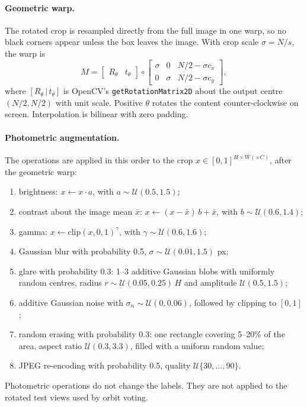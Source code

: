 \paragraph{Geometric warp.}
The rotated crop is resampled directly from the full image in one warp, so no black corners appear unless the box leaves the image. With crop scale $\sigma=N/s$, the warp is
\begin{equation}
  M=\begin{bmatrix}R_\theta & t_\theta\end{bmatrix}\circ\begin{bmatrix}\sigma&0&N/2-\sigma c_x\\0&\sigma&N/2-\sigma c_y\end{bmatrix},
\end{equation}
where $[R_\theta\,|\,t_\theta]$ is OpenCV's \texttt{getRotationMatrix2D} about the output centre $(N/2,N/2)$ with unit scale. Positive $\theta$ rotates the content counter-clockwise on screen. Interpolation is bilinear with zero padding.

\paragraph{Photometric augmentation.}
The operations are applied in this order to the crop $x\in[0,1]^{H\times W(\times C)}$, after the geometric warp:
\begin{enumerate}
  \item brightness: $x\leftarrow x\cdot a$, with $a\sim\mathcal{U}(0.5,1.5)$;
  \item contrast about the image mean $\bar x$: $x\leftarrow(x-\bar x)\,b+\bar x$, with $b\sim\mathcal{U}(0.6,1.4)$;
  \item gamma: $x\leftarrow\mathrm{clip}(x,0,1)^{\gamma}$, with $\gamma\sim\mathcal{U}(0.6,1.6)$;
  \item Gaussian blur with probability 0.5, $\sigma\sim\mathcal{U}(0.01,1.5)$ px;
  \item glare with probability 0.3: 1--3 additive Gaussian blobs with uniformly random centres, radius $r\sim\mathcal{U}(0.05,0.25)\,H$ and amplitude $\mathcal{U}(0.5,1.5)$;
  \item additive Gaussian noise with $\sigma_n\sim\mathcal{U}(0,0.06)$, followed by clipping to $[0,1]$;
  \item random erasing with probability 0.3: one rectangle covering 5--20\% of the area, aspect ratio $\mathcal{U}(0.3,3.3)$, filled with a uniform random value;
  \item JPEG re-encoding with probability 0.5, quality $\mathcal{U}\{30,\dots,90\}$.
\end{enumerate}
Photometric operations do not change the labels. They are not applied to the rotated test views used by orbit voting.

